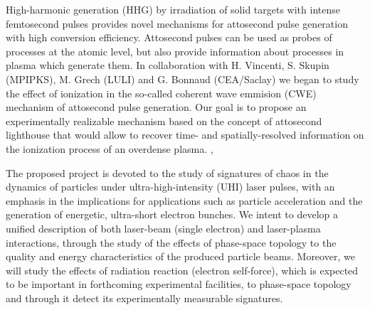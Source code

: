 \documentclass[11pt,a4paper,final]{moderncv}
\begin{document}
High-harmonic generation (HHG) by irradiation of solid targets with intense femtosecond pulses provides novel mechanisms for attosecond pulse
generation with high conversion efficiency. Attosecond pulses can be used as probes of processes at the atomic level, but also provide information
about processes in plasma which generate them. In collaboration with H. Vincenti, S. Skupin (MPIPKS), M. Grech (LULI) and G. Bonnaud (CEA/Saclay) 
we began to study the effect of ionization in the so-called coherent wave emmision (CWE) mechanism of attosecond pulse generation. Our goal is
to propose an experimentally realizable mechanism based on the concept of attosecond lighthouse that would allow to recover time- and spatially-resolved
information on the ionization process of an overdense plasma.
\sep


The proposed project is devoted to the study of signatures of chaos in the dynamics of particles under ultra-high-intensity (UHI) laser pulses, with an emphasis
in the implications for applications such as particle acceleration and the generation of energetic, ultra-short electron bunches. 
We intent to develop a unified description of both laser-beam (single electron) and laser-plasma interactions, through the study of the effects of phase-space
topology to the quality and energy characteristics of the produced particle beams. Moreover, we will study the effects of radiation reaction (electron self-force), which
is expected to be important in forthcoming experimental facilities, to phase-space topology and through it detect its experimentally measurable signatures.
\\ \\ \\ 


\end{document}
